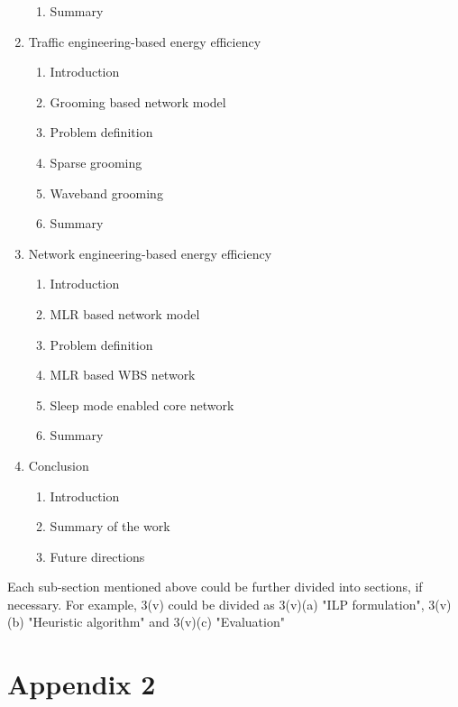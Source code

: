\documentclass{article}
\begin{document}
\begin{enumerate}
\begin{enumerate}[i]
\item Summary
\end{enumerate}
\item Traffic engineering-based energy efficiency
\begin{enumerate}[i]
\item Introduction
\item Grooming based network model
\item Problem definition
\item Sparse grooming 
\item Waveband grooming 
\item Summary
\end{enumerate}
\item Network engineering-based energy efficiency \begin{enumerate}[i]
\item Introduction
\item MLR based network model
\item Problem definition
\item MLR based WBS network
\item Sleep mode enabled core network
\item Summary
\end{enumerate}
\item Conclusion
\begin{enumerate}[i]
\item Introduction
\item Summary of the work
\item Future directions
\end{enumerate}
\end{enumerate}
Each sub-section mentioned above could be further divided into sections, if necessary. For example, 3(v) could be divided as 3(v)(a) "ILP formulation", 3(v)(b) "Heuristic algorithm" and 3(v)(c) "Evaluation"
\newpage
\centering
\vspace*{2.5in}
\section*{\LARGE Appendix 2}

\end{document}
